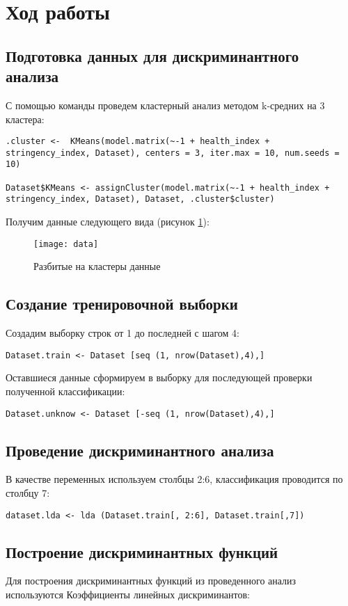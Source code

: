 \documentclass[a4paper,14pt]{extarticle}
\begin{document}
\section{Ход работы}
\subsection{Подготовка данных для дискриминантного анализа}
С помощью команды проведем кластерный анализ методом k-средних на 3 кластера:

\begin{lstlisting}
.cluster <-  KMeans(model.matrix(~-1 + health_index + stringency_index, Dataset), centers = 3, iter.max = 10, num.seeds = 10)

Dataset$KMeans <- assignCluster(model.matrix(~-1 + health_index + stringency_index, Dataset), Dataset, .cluster$cluster)
\end{lstlisting}

Получим данные следующего вида (рисунок \ref{fig:data}):

\begin{figure}[H]
    \centering
    \texttt{[image: data]}
    \caption{Разбитые на кластеры данные}
    \label{fig:data}
\end{figure}

\subsection{Создание тренировочной выборки}
Создадим выборку строк от 1 до последней с шагом 4:
\begin{lstlisting}
Dataset.train <- Dataset [seq (1, nrow(Dataset),4),]
\end{lstlisting}
Оставшиеся данные сформируем в выборку для последующей проверки полученной классификации:
\begin{lstlisting}
Dataset.unknow <- Dataset [-seq (1, nrow(Dataset),4),]
\end{lstlisting}

\subsection{Проведение дискриминантного анализа}
В качестве переменных используем столбцы 2:6, классификация проводится по столбцу 7:
\begin{lstlisting}
dataset.lda <- lda (Dataset.train[, 2:6], Dataset.train[,7])
\end{lstlisting}

\subsection{Построение дискриминантных функций}
Для построения дискриминантных функций из проведенного анализ используются
Коэффициенты линейных дискриминантов:
\end{document}
